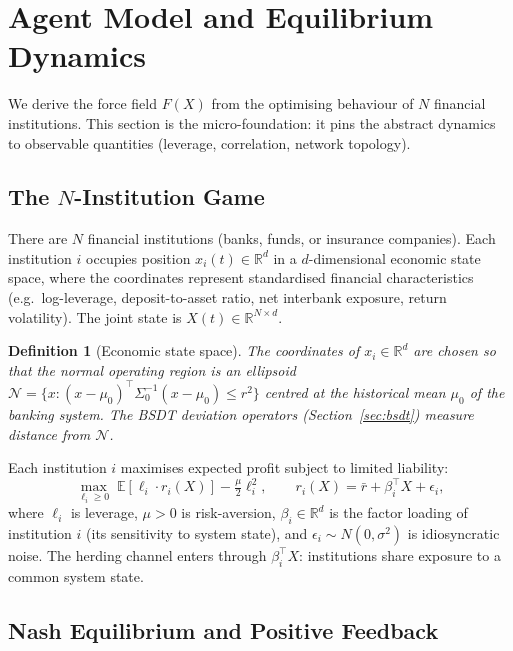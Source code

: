 \documentclass[11pt]{article}
\newtheorem{definition}[theorem]{Definition}
\theoremstyle{definition}
\newcommand{\R}{\mathbb{R}}
\newcommand{\E}{\mathbb{E}}
\begin{document}
\section{Agent Model and Equilibrium Dynamics}
\label{sec:model}

We derive the force field $F(X)$ from the optimising behaviour of $N$ financial
institutions.  This section is the micro-foundation: it pins the abstract
dynamics to observable quantities (leverage, correlation, network topology).

\subsection{The $N$-Institution Game}

There are $N$ financial institutions (banks, funds, or insurance companies).
Each institution $i$ occupies position $x_i(t) \in \R^d$ in a $d$-dimensional
economic state space, where the coordinates represent standardised financial
characteristics (e.g.\ log-leverage, deposit-to-asset ratio, net interbank
exposure, return volatility).  The joint state is $X(t) \in \R^{N \times d}$.

\begin{definition}[Economic state space]
The coordinates of $x_i \in \R^d$ are chosen so that the \emph{normal operating
region} is an ellipsoid $\mathcal{N} = \{x : (x - \mu_0)^\top \Sigma_0^{-1}(x-\mu_0) \le r^2\}$
centred at the historical mean $\mu_0$ of the banking system.
The BSDT deviation operators (Section~\ref{sec:bsdt}) measure distance from $\mathcal{N}$.
\end{definition}

Each institution $i$ maximises expected profit subject to limited liability:
\begin{equation}\label{eq:institution_opt}
  \max_{\ell_i \ge 0}\; \E[\ell_i \cdot r_i(X)] - \tfrac{\mu}{2}\ell_i^2,
  \qquad r_i(X) = \bar r + \beta_i^\top X + \epsilon_i,
\end{equation}
where $\ell_i$ is leverage, $\mu > 0$ is risk-aversion, $\beta_i \in \R^d$ is the
factor loading of institution $i$ (its sensitivity to system state), and
$\epsilon_i \sim N(0,\sigma^2)$ is idiosyncratic noise.  The herding channel enters
through $\beta_i^\top X$: institutions share exposure to a common
system state.

\subsection{Nash Equilibrium and Positive Feedback}
\end{document}
